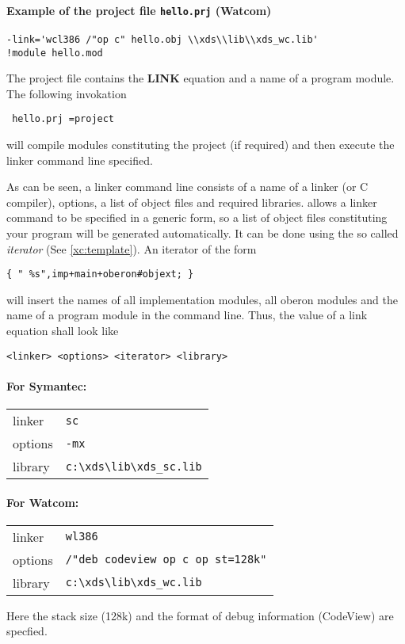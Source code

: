 \paragraph{Example of the project file {\tt hello.prj} (Watcom)}
\begin{verbatim}
-link='wcl386 /"op c" hello.obj \\xds\\lib\\xds_wc.lib'
!module hello.mod
\end{verbatim}
The project file contains the {\bf LINK} equation and
a name of a program module.
The following invokation
\begin{flushleft} \tt
        \xc{} hello.prj =project
\end{flushleft}
will compile modules constituting the project (if required) and
then execute the linker command line specified.

As can be seen, a linker command line consists of a name of a linker
(or C compiler), options, a list of object files and required libraries.
\XDS{} allows a linker command to be specified in a generic form, so
a list of object files constituting your program will be generated
automatically. It can be done using the so called {\em iterator}
(See \ref{xc:template}). An iterator of the form
\begin{verbatim}
{ " %s",imp+main+oberon#objext; }
\end{verbatim}
will insert the names of all implementation modules,
all oberon modules and the name of a program module in the command line.
Thus, the value of a link equation shall look like
\begin{verbatim}
<linker> <options> <iterator> <library>
\end{verbatim}

\paragraph{For Symantec:}
\begin{flushleft}
\begin{tabular}{ll}
linker  & \verb|sc|                            \\
options & \verb|-mx|                           \\
library & \verb|c:\xds\lib\xds_sc.lib|         \\
\end{tabular}
\end{flushleft}

\paragraph{For Watcom:}
\begin{flushleft}
\begin{tabular}{ll}
linker  & \verb|wl386|                            \\
options & \verb|/"deb codeview op c op st=128k"|  \\
library & \verb|c:\xds\lib\xds_wc.lib|            \\
\end{tabular}
\end{flushleft}
Here the stack size (128k) and the format of debug
information (CodeView) are specfied.

